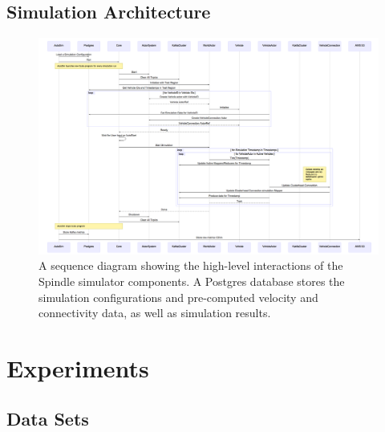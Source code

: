 \documentclass{thesis}
\begin{document}
\section{Simulation Architecture}
    \begin{landscape}
        \begin{figure}
            \centering
            \includegraphics[scale=.3]{binImages/simulator-sequence.png}
            \caption{A sequence diagram showing the high-level interactions of
            the Spindle simulator components. A Postgres database stores the
            simulation configurations and pre-computed velocity and connectivity
            data, as well as simulation results.}
        \end{figure}
    \end{landscape}




\chapter{Experiments}
\section{Data Sets}
\end{document}
